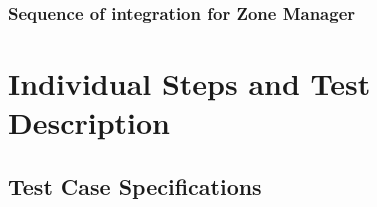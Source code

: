 \documentclass[a4paper,11pt]{report} %
\begin{document}
		\subsubsection{Sequence of integration for Zone Manager} \label{sec:2.4.8}
		\begin{minipage}{\linewidth}
		\end{minipage}							
	
	
	\section{Individual Steps and Test Description}
		\subsection{Test Case Specifications}
\end{document}
